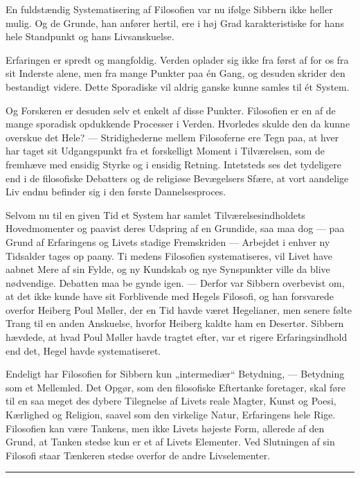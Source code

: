 \documentclass[12pt,a4paper,openany]{book}
\newcommand{\opage}[1]{\marginnote{\footnotesize\textit{[#1]}}}
\begin{document}
En fuldstændig Systematisering af Filosofien var nu ifølge Sibbern ikke heller
mulig. Og de Grunde, han anfører hertil, ere i høj Grad karakteristiske for
hans hele Standpunkt og hans Livsanskuelse.

Erfaringen er spredt og mangfoldig. Verden oplader sig ikke fra først af for os
fra sit Inderste alene, men fra mange Punkter paa én Gang, og desuden skrider
den bestandigt videre. Dette Sporadiske vil aldrig ganske kunne samles til ét System.

Og Forskeren er desuden selv et enkelt af disse Punkter. Filosofien er en af de
mange sporadisk opdukkende Processer i Verden. Hvorledes skulde den da kunne
overskue det Hele? --- Stridighederne mellem Filosoferne ere Tegn paa, at hver
har taget sit Udgangspunkt fra et forskelligt Moment i Tilværelsen, som de
fremhæve med ensidig Styrke og i ensidig Retning. Intetsteds ses det tydeligere
end i de filosofiske Debatters og de religiøse Bevægelsers Sfære, at vort
aandelige Liv endnu befinder sig i den første Dannelsesproces.

Selvom nu til en given Tid et System har samlet Tilværelsesindholdets
Hovedmomenter og paavist deres Udspring af en Grundide, saa maa dog --- paa
Grund af Erfaringens og Livets stadige Fremskriden --- Arbejdet i enhver ny
Tidsalder tages op paany. Ti medens Filosofien systematiseres, vil Livet have
aabnet Mere af sin Fylde, og ny Kundskab og nye Synspunkter ville da blive
nødvendige. Debatten maa be%
\setcounter{footnote}{0}%
\opage{112}gynde igen. --- Derfor var Sibbern overbevist om, at det ikke kunde
have sit Forblivende med Hegels Filosofi, og han forsvarede overfor Heiberg
Poul Møller, der en Tid havde været Hegelianer, men senere følte Trang til en
anden Anskuelse, hvorfor Heiberg kaldte ham en Desertør. Sibbern hævdede, at
hvad Poul Møller havde tragtet efter, var et rigere Erfaringsindhold end det,
Hegel havde systematiseret.

Endeligt har Filosofien for Sibbern kun „intermediær“ Betydning, --- Betydning
som et Mellemled. Det Opgør, som den filosofiske Eftertanke foretager, skal
føre til en saa meget des dybere Tilegnelse af Livets reale Magter, Kunst og
Poesi, Kærlighed og Religion, saavel som den virkelige Natur, Erfaringens hele
Rige. Filosofien kan være Tankens, men ikke Livets højeste Form, allerede af
den Grund, at Tanken stedse kun er et af Livets Elementer. Ved Slutningen af
sin Filosofi staar Tænkeren stedse overfor de andre Livselementer.

\begin{center}\rule{2cm}{0.4pt}\end{center}
\end{document}
